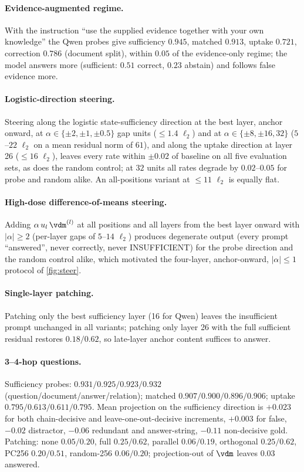 \paragraph{Evidence-augmented regime.} With the instruction ``use the supplied evidence together with your own knowledge'' the Qwen probes give sufficiency $0.945$, matched $0.913$, uptake $0.721$, correction $0.786$ (document split), within $0.05$ of the evidence-only regime; the model answers more (sufficient: $0.51$ correct, $0.23$ abstain) and follows false evidence more.

\paragraph{Logistic-direction steering.} Steering along the logistic state-sufficiency direction at the best layer, anchor onward, at $\alpha\in\{\pm2,\pm1,\pm0.5\}$ gap units ($\le1.4$ $\ell_2$) and at $\alpha\in\{\pm8,\pm16,32\}$ ($5$--$22$ $\ell_2$ on a mean residual norm of $61$), and along the uptake direction at layer 26 ($\le16$ $\ell_2$), leaves every rate within $\pm0.02$ of baseline on all five evaluation sets, as does the random control; at $32$ units all rates degrade by $0.02$--$0.05$ for probe and random alike. An all-positions variant at $\le11$ $\ell_2$ is equally flat.

\paragraph{High-dose difference-of-means steering.} Adding $\alpha\,u_l\,\vdm^{(l)}$ at all positions and all layers from the best layer onward with $|\alpha|\ge2$ (per-layer gaps of $5$--$14$ $\ell_2$) produces degenerate output (every prompt ``answered'', never correctly, never INSUFFICIENT) for the probe direction and the random control alike, which motivated the four-layer, anchor-onward, $|\alpha|\le1$ protocol of \cref{fig:steer}.

\paragraph{Single-layer patching.} Patching only the best sufficiency layer (16 for Qwen) leaves the insufficient prompt unchanged in all variants; patching only layer 26 with the full sufficient residual restores $0.18/0.62$, so late-layer anchor content suffices to answer.

\paragraph{3--4-hop questions.} Sufficiency probes: $0.931/0.925/0.923/0.932$ (question/document/answer/relation); matched $0.907/0.900/0.896/0.906$; uptake $0.795/0.613/0.611/0.795$. Mean projection on the sufficiency direction is $+0.023$ for both chain-decisive and leave-one-out-decisive increments, $+0.003$ for false, $-0.02$ distractor, $-0.06$ redundant and answer-string, $-0.11$ non-decisive gold. Patching: none $0.05/0.20$, full $0.25/0.62$, parallel $0.06/0.19$, orthogonal $0.25/0.62$, PC256 $0.20/0.51$, random-256 $0.06/0.20$; projection-out of $\vdm$ leaves $0.03$ answered.

